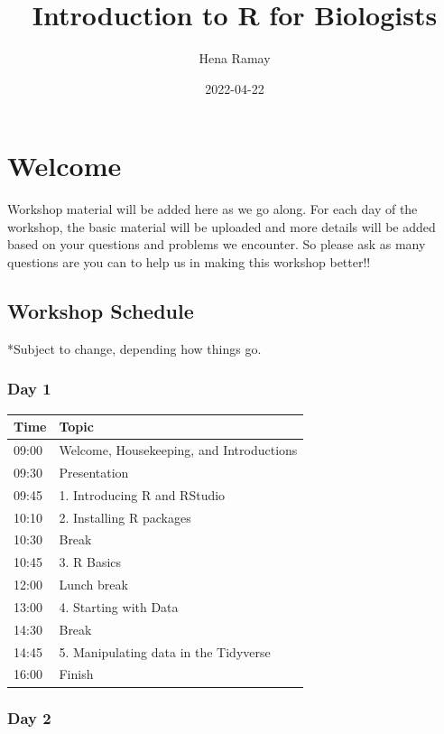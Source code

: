 \documentclass[
]{book}
\title{Introduction to R for Biologists}
\author{Hena Ramay}
\date{2022-04-22}
\begin{document}
\maketitle

{
\setcounter{tocdepth}{1}
\tableofcontents
}
\hypertarget{welcome}{%
\chapter{Welcome}\label{welcome}}

Workshop material will be added here as we go along. For each day of the workshop, the basic material will be uploaded and more details will be added based on your questions and problems we encounter. So please ask as many questions are you can to help us in making this workshop better!!

\hypertarget{workshop-schedule}{%
\section{Workshop Schedule}\label{workshop-schedule}}

*Subject to change, depending how things go.

\hypertarget{day-1}{%
\subsection*{Day 1}\label{day-1}}

\begin{longtable}[]{@{}ll@{}}
\toprule
Time & Topic \\
\midrule
\endhead
09:00 & Welcome, Housekeeping, and Introductions \\
09:30 & Presentation \\
09:45 & 1. Introducing R and RStudio \\
10:10 & 2. Installing R packages \\
10:30 & Break \\
10:45 & 3. R Basics \\
12:00 & Lunch break \\
13:00 & 4. Starting with Data \\
14:30 & Break \\
14:45 & 5. Manipulating data in the Tidyverse \\
16:00 & Finish \\
\bottomrule
\end{longtable}

\hypertarget{day-2}{%
\subsection*{Day 2}\label{day-2}}
\end{document}

